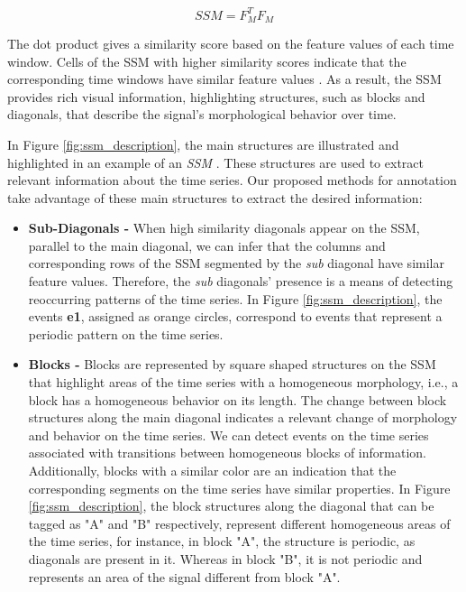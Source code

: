 \begin{equation}
    SSM = F^T_M F_M
\end{equation}

The dot product gives a similarity score based on the feature values of each time window. Cells of the \gls{SSM} with higher similarity scores indicate that the corresponding time windows have similar feature values \cite{audiolabs1, audiolabs2}. As a result, the \gls{SSM} provides rich visual information, highlighting structures, such as blocks and diagonals, that describe the signal's morphological behavior over time.
\par
In Figure \ref{fig:ssm_description}, the main structures are illustrated and highlighted in an example of an \textit{\gls{SSM}} \cite{audiolabs1}. These structures are used to extract relevant information about the time series. Our proposed methods for annotation take advantage of these main structures to extract the desired information:

\begin{itemize}
    \item \textbf{Sub-Diagonals -} When high similarity diagonals appear on the \gls{SSM}, parallel to the main diagonal, we can infer that the columns and corresponding rows of the \gls{SSM} segmented by the \textit{sub} diagonal have similar feature values. Therefore, the \textit{sub} diagonals' presence is a means of detecting reoccurring patterns of the time series. In Figure \ref{fig:ssm_description}, the events \textbf{e1}, assigned as orange circles, correspond to events that represent a periodic pattern on the time series.
    
    \item \textbf{Blocks -} Blocks are represented by square shaped structures on the \gls{SSM} that highlight areas of the time series with a homogeneous morphology, i.e., a block has a homogeneous behavior on its length. The change between block structures along the main diagonal indicates a relevant change of morphology and behavior on the time series. We can detect events on the time series associated with transitions between homogeneous blocks of information. Additionally, blocks with a similar color are an indication that the corresponding segments on the time series have similar properties. In Figure \ref{fig:ssm_description}, the block structures along the diagonal that can be tagged as "A" and "B" respectively, represent different homogeneous areas of the time series, for instance, in block "A", the structure is periodic, as diagonals are present in it. Whereas in block "B", it is not periodic and represents an area of the signal different from block "A".
\end{itemize}

